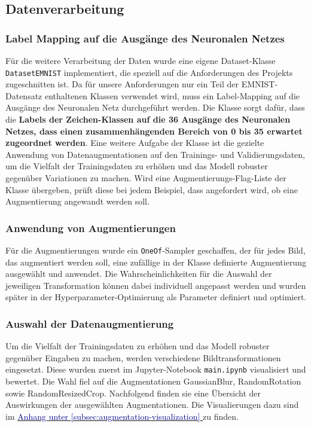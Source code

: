 \documentclass[12pt,oneside]{article}
\begin{document}
			
			
			
			
	\subsection{Datenverarbeitung}
		\subsubsection{Label Mapping auf die Ausgänge des Neuronalen Netzes}
			Für die weitere Verarbeitung der Daten wurde eine eigene Dataset-Klasse \texttt{DatasetEMNIST} implementiert, die speziell auf die Anforderungen des Projekts zugeschnitten ist. Da für unsere Anforderungen nur ein Teil der EMNIST-Datensatz enthaltenen Klassen verwendet wird, muss ein Label-Mapping auf die Ausgänge des Neuronalen Netz durchgeführt werden.
			Die Klasse sorgt dafür, dass die \textbf{Labels der Zeichen-Klassen auf die 36 Ausgänge des Neuronalen Netzes, dass einen zusammenhängenden Bereich von 0 bis 35 erwartet zugeordnet werden}. Eine weitere Aufgabe der Klasse ist die gezielte Anwendung von Datenaugmentationen auf den Trainings- und Validierungsdaten, um die Vielfalt der Trainingsdaten zu erhöhen und das Modell robuster gegenüber Variationen zu machen. Wird eine Augmentierungs-Flag-Liste der Klasse übergeben, prüft diese bei jedem Beispiel, dass angefordert wird, ob eine Augmentierung angewandt werden soll. 
		
		\subsubsection{Anwendung von Augmentierungen}
			Für die Augmentierungen wurde ein \texttt{OneOf}-Sampler geschaffen, der für jedes Bild, das augmentiert werden soll, eine zufällige in der Klasse definierte Augmentierung ausgewählt und anwendet. Die Wahrscheinlichkeiten für die Auswahl der jeweiligen Transformation können dabei individuell angepasst werden und wurden später in der Hyperparameter-Optimierung als Parameter definiert und optimiert.
		
		\subsubsection{Auswahl der Datenaugmentierung}
			Um die Vielfalt der Trainingsdaten zu erhöhen und das Modell robuster gegenüber Eingaben zu machen, werden verschiedene Bildtransformationen eingesetzt. Diese wurden zuerst im Jupyter-Notebook \texttt{main.ipynb} \cite{noauthor_project_nodate} visualisiert und bewertet. Die Wahl fiel auf die Augmentationen GaussianBlur, RandomRotation sowie RandomResizedCrop. 
			Nachfolgend finden sie eine Übersicht der Auswirkungen der ausgewählten Augmentationen. Die Visualierungen dazu sind im  \hyperref[subsec:augmentation-visualization]{\textcolor{darkblue}{Anhang unter \ref*{subsec:augmentation-visualization} }} zu finden.
			
\end{document}
